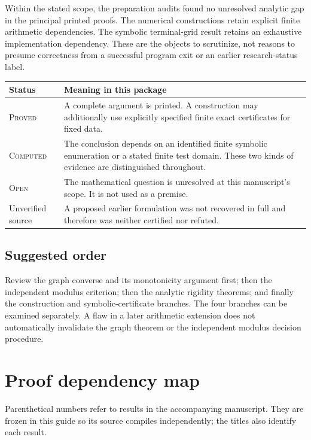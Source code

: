 \documentclass[10pt]{article}
\newcommand{\proved}{\textsc{Proved}}
\newcommand{\computed}{\textsc{Computed}}
\newcommand{\open}{\textsc{Open}}
\begin{document}
Within the stated scope, the preparation audits found no unresolved
analytic gap in the principal printed proofs. The numerical constructions
retain explicit finite arithmetic dependencies. The symbolic terminal-grid
result retains an exhaustive implementation dependency. These are the
objects to scrutinize, not reasons to presume correctness from a successful
program exit or an earlier research-status label.

\begin{center}\small
\begin{tabular}{@{}>{\raggedright\arraybackslash}p{.17\linewidth}>{\raggedright\arraybackslash}p{.76\linewidth}@{}}
\toprule
Status & Meaning in this package\\\midrule
\proved & A complete argument is printed. A construction may additionally
use explicitly specified finite exact certificates for fixed data.\\
\computed & The conclusion depends on an identified finite symbolic
enumeration or a stated finite test domain. These two kinds of evidence
are distinguished throughout.\\
\open & The mathematical question is unresolved at this manuscript's
scope. It is not used as a premise.\\
Unverified source & A proposed earlier formulation was not recovered in
full and therefore was neither certified nor refuted.\\
\bottomrule
\end{tabular}
\end{center}

\subsection*{Suggested order}
Review the graph converse and its monotonicity argument first; then the
independent modulus criterion; then the analytic rigidity theorems; and
finally the construction and symbolic-certificate branches. The four
branches can be examined separately. A flaw in a later arithmetic extension
does not automatically invalidate the graph theorem or the independent
modulus decision procedure.

\newpage
\section{Proof dependency map}

Parenthetical numbers refer to results in the accompanying manuscript.
They are frozen in this guide so its source compiles independently; the
titles also identify each result.
\end{document}

